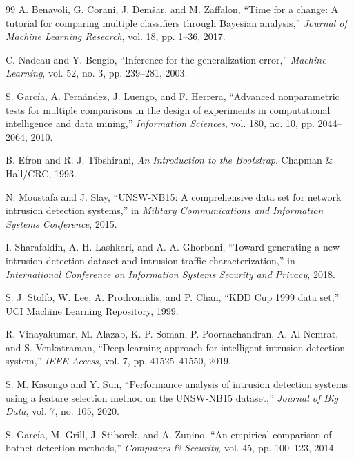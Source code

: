 \documentclass[10pt,conference]{IEEEtran}
\begin{document}
\begin{thebibliography}{99}
A. Benavoli, G. Corani, J. Dem\v{s}ar, and M. Zaffalon, ``Time for a
change: A tutorial for comparing multiple classifiers through Bayesian
analysis,'' \emph{Journal of Machine Learning Research}, vol. 18,
pp. 1--36, 2017.

C. Nadeau and Y. Bengio, ``Inference for the generalization error,''
\emph{Machine Learning}, vol. 52, no. 3, pp. 239--281, 2003.

S. Garc\'ia, A. Fern\'andez, J. Luengo, and F. Herrera, ``Advanced
nonparametric tests for multiple comparisons in the design of experiments
in computational intelligence and data mining,'' \emph{Information
Sciences}, vol. 180, no. 10, pp. 2044--2064, 2010.

B. Efron and R. J. Tibshirani, \emph{An Introduction to the Bootstrap}.
Chapman \& Hall/CRC, 1993.

N. Moustafa and J. Slay, ``UNSW-NB15: A comprehensive data set for
network intrusion detection systems,'' in \emph{Military Communications
and Information Systems Conference}, 2015.

I. Sharafaldin, A. H. Lashkari, and A. A. Ghorbani, ``Toward generating a
new intrusion detection dataset and intrusion traffic characterization,''
in \emph{International Conference on Information Systems Security and
Privacy}, 2018.

S. J. Stolfo, W. Lee, A. Prodromidis, and P. Chan, ``KDD Cup 1999 data
set,'' UCI Machine Learning Repository, 1999.

R. Vinayakumar, M. Alazab, K. P. Soman, P. Poornachandran, A. Al-Nemrat,
and S. Venkatraman, ``Deep learning approach for intelligent intrusion
detection system,'' \emph{IEEE Access}, vol. 7, pp. 41525--41550, 2019.

S. M. Kasongo and Y. Sun, ``Performance analysis of intrusion detection
systems using a feature selection method on the UNSW-NB15 dataset,''
\emph{Journal of Big Data}, vol. 7, no. 105, 2020.

S. Garc\'ia, M. Grill, J. Stiborek, and A. Zunino, ``An empirical
comparison of botnet detection methods,'' \emph{Computers \& Security},
vol. 45, pp. 100--123, 2014.


\end{thebibliography}
\end{document}

